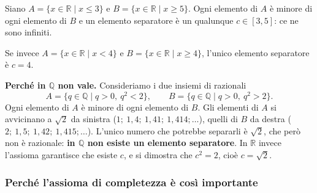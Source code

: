 \documentclass[11pt,a4paper]{article}
\begin{document}
\begin{esempio}
Siano $A = \{x \in \mathbb{R} \mid x \leq 3\}$ e $B = \{x \in \mathbb{R} \mid x \geq 5\}$. Ogni elemento di $A$ è minore di ogni elemento di $B$ e un elemento separatore è un qualunque $c \in [3, 5]$: ce ne sono infiniti.

Se invece $A = \{x \in \mathbb{R} \mid x < 4\}$ e $B = \{x \in \mathbb{R} \mid x \geq 4\}$, l'unico elemento separatore è $c = 4$.
\end{esempio}

\textbf{Perché in $\mathbb{Q}$ non vale.} Consideriamo i due insiemi di
razionali
\[
A = \{q \in \mathbb{Q} \mid q > 0,\ q^2 < 2\}, \qquad
B = \{q \in \mathbb{Q} \mid q > 0,\ q^2 > 2\}.
\]
Ogni elemento di $A$ è minore di ogni elemento di $B$. Gli elementi di $A$
si avvicinano a $\sqrt{2}$ da sinistra ($1;\ 1{,}4;\ 1{,}41;\ 1{,}414;
\dots$), quelli di $B$ da destra ($2;\ 1{,}5;\ 1{,}42;\ 1{,}415; \dots$).
L'unico numero che potrebbe separarli è $\sqrt{2}$, che però non è
razionale: \textbf{in $\mathbb{Q}$ non esiste un elemento separatore}.
In $\mathbb{R}$ invece l'assioma garantisce che esiste $c$, e si dimostra
che $c^2 = 2$, cioè $c = \sqrt{2}$.

\subsubsection*{Perché l'assioma di completezza è così importante}
\end{document}
